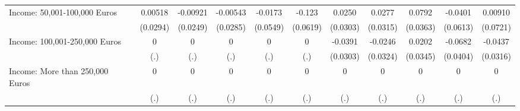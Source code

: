 {\begin{tabular}{l*{10}{c}}
Income: 50,001-100,000 Euros&     0.00518         &    -0.00921         &    -0.00543         &     -0.0173         &      -0.123\sym{*}  &      0.0250         &      0.0277         &      0.0792\sym{*}  &     -0.0401         &     0.00910         \\
            &    (0.0294)         &    (0.0249)         &    (0.0285)         &    (0.0549)         &    (0.0619)         &    (0.0303)         &    (0.0315)         &    (0.0363)         &    (0.0613)         &    (0.0721)         \\
\addlinespace
Income: 100,001-250,000 Euros&           0         &           0         &           0         &           0         &           0         &     -0.0391         &     -0.0246         &      0.0202         &     -0.0682         &     -0.0437         \\
            &         (.)         &         (.)         &         (.)         &         (.)         &         (.)         &    (0.0303)         &    (0.0324)         &    (0.0345)         &    (0.0404)         &    (0.0316)         \\
\addlinespace
Income: More than 250,000 Euros&           0         &           0         &           0         &           0         &           0         &           0         &           0         &           0         &           0         &           0         \\
            &         (.)         &         (.)         &         (.)         &         (.)         &         (.)         &         (.)         &         (.)         &         (.)         &         (.)         &         (.)         \\
\bottomrule
\end{tabular}
}
